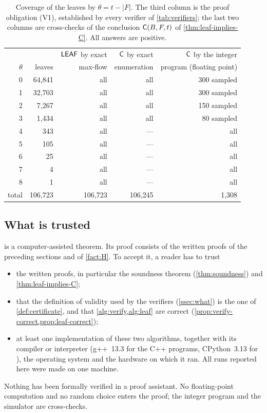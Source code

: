\begin{table}[ht]
\centering\small
\begin{tabular}{@{}rrrrr@{}}
\toprule
 & & $\mathsf{LEAF}$ by exact & $\mathsf{C}$ by exact & $\mathsf{C}$ by the integer\\
$\theta$ & leaves & max-flow & enumeration & program (floating point)\\
\midrule
0 & 64{,}841 & all & all & 300 sampled\\
1 & 32{,}703 & all & all & 300 sampled\\
2 & 7{,}267 & all & all & 150 sampled\\
3 & 1{,}434 & all & all & 80 sampled\\
4 & 343 & all & --- & all\\
5 & 105 & all & --- & all\\
6 & 25 & all & --- & all\\
7 & 4 & all & --- & all\\
8 & 1 & all & --- & all\\
\midrule
total & 106{,}723 & 106{,}723 & 106{,}245 & 1{,}308\\
\bottomrule
\end{tabular}
\caption{Coverage of the leaves by $\theta=t-|F|$. The third column is the proof obligation (V1),
established by every verifier of \cref{tab:verifiers}; the last two columns are cross-checks of the
conclusion $\mathsf{C}(B,F,t)$ of \cref{thm:leaf-implies-C}. All answers are positive.}
\label{tab:leaves}
\end{table}

\subsection{What is trusted}\label{ssec:trust}

 is a computer-assisted theorem. Its proof consists of the written proofs of the
preceding sections and of \cref{fact:H}. To accept it, a reader has to trust
\begin{itemize}[leftmargin=1.6em]
\item the written proofs, in particular the soundness theorem (\cref{thm:soundness}) and
  \cref{thm:leaf-implies-C};
\item that the definition of validity used by the verifiers (\cref{ssec:what}) is the one of
  \cref{def:certificate}, and that \cref{alg:verify,alg:leaf} are correct
  (\cref{prop:verify-correct,prop:leaf-correct});
\item at least one implementation of these two algorithms, together with its compiler or interpreter
  (g++~13.3 for the C++ programs, CPython~3.13 for ), the operating system and the
  hardware on which it ran. All runs reported here were made on one machine.
\end{itemize}
Nothing has been formally verified in a proof assistant. No floating-point computation and no random
choice enters the proof; the integer program and the simulator are cross-checks.

